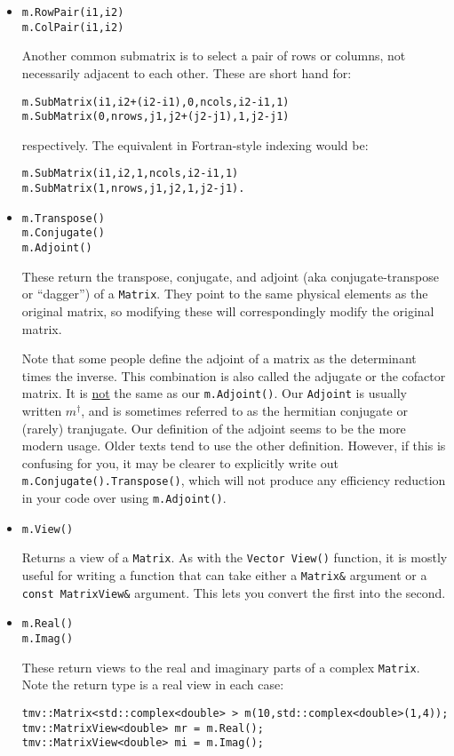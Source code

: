 \documentclass[twoside,letterpaper,11pt]{article}
\renewcommand{\tt}[1]{{\texttt {#1}}}
\begin{document}
\begin{itemize}
\item
\begin{verbatim}
m.RowPair(i1,i2)
m.ColPair(i1,i2)
\end{verbatim}
Another common submatrix is to select a pair of rows or columns, not 
necessarily adjacent to each other.  These are short hand for:
\begin{verbatim}
m.SubMatrix(i1,i2+(i2-i1),0,ncols,i2-i1,1)
m.SubMatrix(0,nrows,j1,j2+(j2-j1),1,j2-j1)
\end{verbatim}
respectively.  The equivalent in Fortran-style indexing would be:
\begin{verbatim}
m.SubMatrix(i1,i2,1,ncols,i2-i1,1)
m.SubMatrix(1,nrows,j1,j2,1,j2-j1).
\end{verbatim}

\item
\begin{verbatim}
m.Transpose()
m.Conjugate()
m.Adjoint()
\end{verbatim}
These return the transpose, conjugate, and adjoint (aka conjugate-transpose
or ``dagger'') of a \tt{Matrix}.  They point to the 
same physical elements as the original matrix, so modifying these will
correspondingly modify the original matrix.

Note that some people define the adjoint of a matrix as the determinant times
the inverse.  This combination is also called the adjugate or the cofactor matrix.
It is \underline{not} the same as our \tt{m.Adjoint()}.  Our \tt{Adjoint} is usually
written $m^\dagger$, and is sometimes referred to as the hermitian conjugate
or (rarely) tranjugate.  Our definition of the adjoint seems to be the more modern
usage.  Older texts tend to use the other definition.  However, if this is confusing
for you, it may be clearer to explicitly write out \tt{m.Conjugate().Transpose()},
which will not produce any efficiency reduction in your code over using
\tt{m.Adjoint()}.

\item
\begin{verbatim}
m.View()
\end{verbatim}
Returns a view of a \tt{Matrix}.  As with the \tt{Vector View()} function, it is mostly
useful for writing a function that can take either a \tt{Matrix\&} argument or a
\tt{const MatrixView\&} argument.  This lets you convert the first into the second.

\item
\begin{verbatim}
m.Real()
m.Imag()
\end{verbatim}
These return views to the real and imaginary parts of a complex \tt{Matrix}.
Note the return type is a real view in each case:
\begin{verbatim}
tmv::Matrix<std::complex<double> > m(10,std::complex<double>(1,4));
tmv::MatrixView<double> mr = m.Real();
tmv::MatrixView<double> mi = m.Imag();
\end{verbatim}

\end{itemize}
\end{document}
